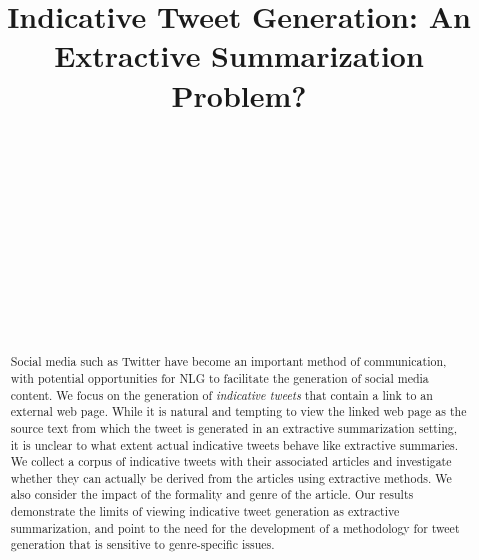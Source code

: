\documentclass[11pt,a4paper]{article}
\title{Indicative Tweet Generation: An Extractive Summarization Problem?}
\author{ \\
  \\
   \\
   \\
  {\tt} \\\
   \\
   \\
  \\
  \\
  {\tt} \\}
\date{}
\begin{document}
\maketitle
\begin{abstract}
Social media such as Twitter have become an important method of communication, with potential opportunities for NLG to facilitate the generation of social media content. We focus on the generation of \emph{indicative tweets} that contain a link to an external web page. While it is natural and tempting to view the linked web page as the source text from which the tweet is generated in an extractive summarization setting, it is unclear to what extent actual indicative tweets behave like extractive summaries. We collect a corpus of indicative tweets with their associated articles and investigate whether they can actually be derived from the articles using extractive methods. We also consider the impact of the formality and genre of the article. Our results demonstrate the limits of viewing indicative tweet generation as extractive summarization, and point to the need for the development of a methodology for tweet generation that is sensitive to genre-specific issues.



\end{abstract}























\end{document}
